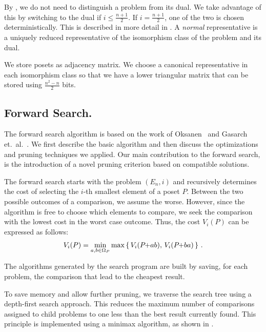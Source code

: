 \documentclass[a4paper,UKenglish,cleveref, autoref, thm-restate]{lipics-v2021}
\newcommand{\pchild}[3]{{#1}\kern-1pt{+}{#2}{#3}}
\begin{document}
By , we do not need to distinguish a problem from its dual.
We take advantage of this by switching to the dual if $i \leq \frac{n+1}{2}$.
If $i = \frac{n+1}{2}$, one of the two is chosen deterministically.
This is described in more detail in .
A \emph{normal} representative is a uniquely reduced representative of the isomorphism class of the problem and its dual.

We store posets as adjacency matrix.
We choose a canonical representative in each isomorphism class so that we have a lower triangular matrix that can be stored using $\frac{n^2 - n}{2}$ bits.



\subsection{Forward Search.} \label{chapter:forward_search}
The forward search algorithm is based on the work of Oksanen~\cite{Oksanen2006} and Gasarch et.\ al\@.~\cite{Gasarch1996}.
We first describe the basic algorithm and then discuss the optimizations and pruning techniques we applied.
Our main contribution to the forward search, is the introduction of a novel pruning criterion based on compatible solutions.

The forward search starts with the problem $(E_n, i)$ and recursively determines the cost of selecting the $i$-th smallest element of a poset $P$.
Between the two possible outcomes of a comparison, we assume the worse.
However, since the algorithm is free to choose which elements to compare, we seek the comparison with the lowest cost in the worst case outcome.
Thus, the cost $V_i(P)$ can be expressed as follows:
\begin{equation}
  V_i(P) = \min_{a,b \in \Omega_P} \max \left\{ \,V_i(\pchild{P}{a}{b}),\, V_i(\pchild{P}{b}{a})\,\right\}\,\text{.}
\end{equation}

The algorithms generated by the search program are built by saving, for each problem, the comparison that lead to the cheapest result.

To save memory and allow further pruning, we traverse the search tree using a depth-first search approach.
This reduces the maximum number of comparisons assigned to child problems to one less than the best result currently found.
This principle is implemented using a minimax algorithm, as shown in .
\end{document}
